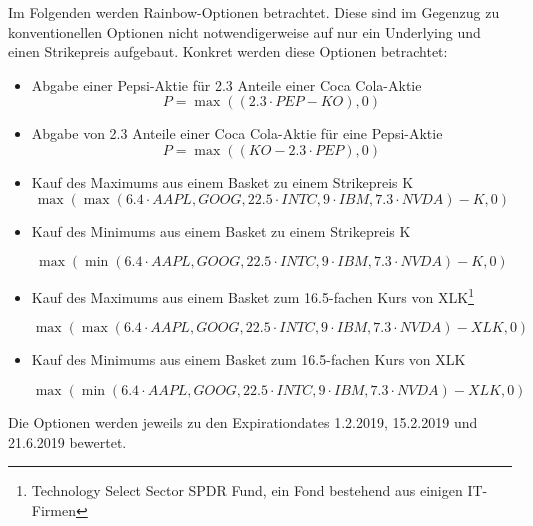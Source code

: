 \documentclass[12pt]{article}
\begin{document}
	Im Folgenden werden Rainbow-Optionen betrachtet. Diese sind im Gegenzug zu konventionellen Optionen nicht notwendigerweise auf nur ein Underlying und einen Strikepreis aufgebaut.
	\newline
	Konkret werden diese Optionen betrachtet:
	\begin{itemize}
		\item Abgabe einer Pepsi-Aktie für 2.3 Anteile einer Coca Cola-Aktie
		\begin{equation*}
		P=\max((2.3\cdot PEP-KO),0)
		\end{equation*}	
		\item Abgabe von 2.3 Anteile einer Coca Cola-Aktie für eine Pepsi-Aktie
		\begin{equation*}
		P=\max((KO-2.3\cdot PEP),0)
		\end{equation*}	
		\item Kauf des Maximums aus einem Basket zu einem Strikepreis K
		\begin{equation*}
		\max(\max(6.4 \cdot AAPL,GOOG,22.5 \cdot INTC, 9 \cdot IBM, 7.3 \cdot NVDA)-K,0)
		\end{equation*}
		\item Kauf des Minimums aus einem Basket zu einem Strikepreis K
		
		\begin{equation*}
		\max(\min(6.4 \cdot AAPL,GOOG,22.5 \cdot INTC, 9 \cdot IBM, 7.3 \cdot NVDA)-K,0)
		\end{equation*}
		\item Kauf des Maximums aus einem Basket zum 16.5-fachen Kurs von XLK\footnote{Technology Select Sector SPDR Fund, ein Fond bestehend aus einigen IT-Firmen}
		
		\begin{equation*}
		\max(\max(6.4 \cdot AAPL,GOOG,22.5 \cdot INTC, 9 \cdot IBM, 7.3 \cdot NVDA)-XLK,0)
		\end{equation*}
		\item Kauf des Minimums aus einem Basket zum 16.5-fachen Kurs von XLK
		
		\begin{equation*}
		\max(\min(6.4 \cdot AAPL,GOOG,22.5 \cdot INTC, 9 \cdot IBM, 7.3 \cdot NVDA)-XLK,0)
		\end{equation*}
		
		
	\end{itemize}
	
	Die Optionen werden jeweils zu den Expirationdates 1.2.2019, 15.2.2019 und 21.6.2019 bewertet.
\end{document}
